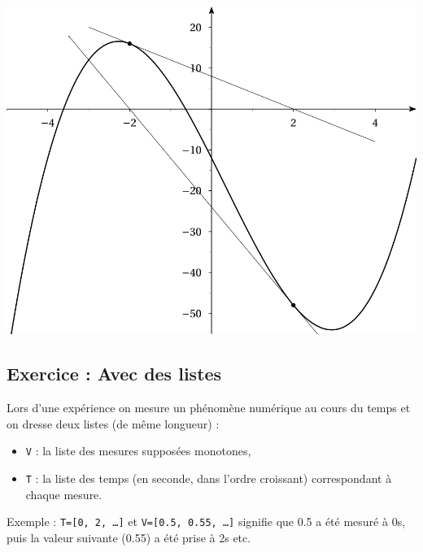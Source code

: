\begin{multicols}{2}
\begin{center}
\includegraphics[width=.48\textwidth]{images/fig2}
\end{center}


\subsection*{Exercice : Avec des listes}
\setcounter{subparagraph}{0}

Lors d'une expérience on mesure un phénomène numérique au cours du temps et on dresse deux listes (de même longueur) :
\begin{itemize}
\item \texttt{V} : la liste des mesures supposées monotones, 
\item \texttt{T} : la liste des temps (en seconde, dans l'ordre croissant) correspondant à chaque mesure.
\end{itemize}
Exemple : \texttt{T=[0, 2, \ldots]} et \texttt{V=[0.5, 0.55, \ldots]} signifie que 0.5 a été mesuré à 0s, puis la valeur suivante  (0.55) a été prise à 2s etc.



\end{multicols}
